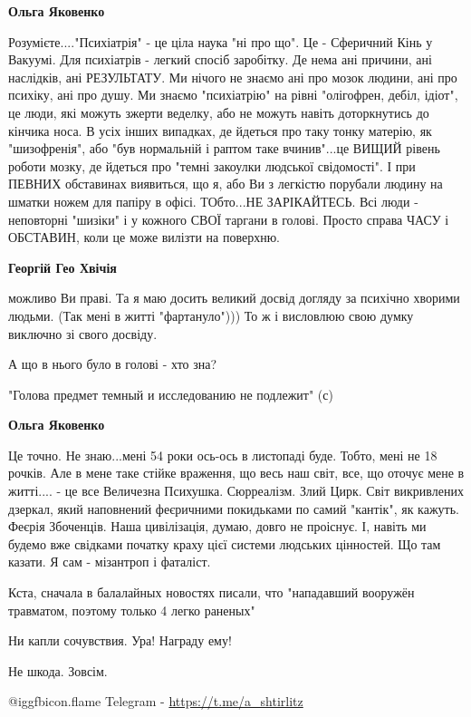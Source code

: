 \begin{itemize}
\begin{itemize}
\textbf{Ольга Яковенко} 

Розумієте...."Психіатрія" - це ціла наука "ні про що". Це - Сферичний Кінь у
Вакуумі. Для психіатрів - легкий спосіб заробітку. Де нема ані причини, ані
наслідків, ані РЕЗУЛЬТАТУ. Ми нічого не знаємо ані про мозок людини, ані про
психіку, ані про душу. Ми знаємо "психіатрію" на рівні "олігофрен, дебіл,
ідіот", це люди, які можуть зжерти веделку, або не можуть навіть доторкнутись
до кінчика носа. В усіх інших випадках, де йдеться про таку тонку матерію, як
"шизофренія", або "був нормальній і раптом таке вчинив"...це ВИЩИЙ рівень
роботи мозку, де йдеться про "темні закоулки людської свідомості". І при ПЕВНИХ
обставинах виявиться, що я, або Ви з легкістю порубали людину на шматки ножем
для папіру в офісі. ТОбто...НЕ ЗАРІКАЙТЕСЬ. Всі люди - неповторні "шизіки" і у
кожного СВОЇ таргани в голові. Просто справа ЧАСУ і ОБСТАВИН, коли це може
вилізти на поверхню.


\textbf{Георгій Гео Хвічія} 

можливо Ви праві. Та я маю досить великий досвід догляду за психічно хворими
людьми. (Так мені в житті "фартануло"))) То ж і висловлюю свою думку виключно
зі свого досвіду.

А що в нього було в голові - хто зна?

"Голова предмет темный и исследованию не подлежит" (с)

\textbf{Ольга Яковенко} 

Це точно. Не знаю...мені 54 роки ось-ось в листопаді буде. Тобто, мені не 18
рочків. Але в мене таке стійке враження, що весь наш світ, все, що оточує мене
в житті.... - це все Величезна Психушка. Сюрреалізм. Злий Цирк. Світ
викривлених дзеркал, який наповнений феєричними покидьками по самий "кантік",
як кажуть. Феєрія Збоченців. Наша цивілізація, думаю, довго не проіснує. І,
навіть ми будемо вже свідками початку краху цієї системи людських цінностей. Що
там казати. Я сам - мізантроп і фаталіст.

\end{itemize} %

Кста, сначала в балалайных новостях писали, что "нападавший вооружён травматом, поэтому только 4 легко раненых"

Ни капли сочувствия. Ура! Награду ему!

Не шкода. Зовсім.

 @igg{fbicon.flame} Telegram - \url{https://t.me/a_shtirlitz}


\end{itemize}
